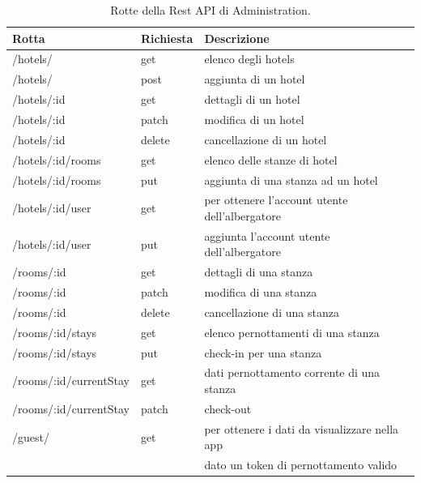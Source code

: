 \begin{table}[H]
    \centering
    \begin{tabular}{|l|l|l|}
    \hline
    \textbf{Rotta}     & \textbf{Richiesta} & \textbf{Descrizione} \\ \hline
    /hotels/           & get & elenco degli hotels    \\ \hline
    /hotels/                     & post & aggiunta di un hotel   \\ \hline  
    /hotels/:id                     & get & dettagli di un hotel  \\ \hline 
    /hotels/:id                     & patch & modifica di un hotel \\ \hline
    /hotels/:id                     & delete & cancellazione di un hotel \\ \hline
    /hotels/:id/rooms           & get & elenco delle stanze di hotel    \\ \hline
    /hotels/:id/rooms           & put & aggiunta di una stanza ad un hotel    \\ \hline
    /hotels/:id/user           & get & per ottenere l'account utente dell'albergatore   \\ \hline
    /hotels/:id/user           & put & aggiunta l'account utente dell'albergatore   \\ \hline
    /rooms/:id                     & get & dettagli di una stanza  \\ \hline 
    /rooms/:id                     & patch & modifica di una stanza \\ \hline
    /rooms/:id                     & delete & cancellazione di una stanza \\ \hline
    /rooms/:id/stays               & get & elenco pernottamenti di una stanza \\ \hline
    /rooms/:id/stays               & put & check-in per una stanza \\ \hline
    /rooms/:id/currentStay         & get & dati pernottamento corrente di una stanza \\ \hline
    /rooms/:id/currentStay         & patch & check-out \\ \hline
    /guest/           & get & per ottenere i dati da visualizzare nella app \\
                      &     & dato un token di pernottamento valido \\ \hline
    
    \end{tabular}
    \caption{\label{administration-routes}Rotte della Rest API di Administration.}

\end{table}

